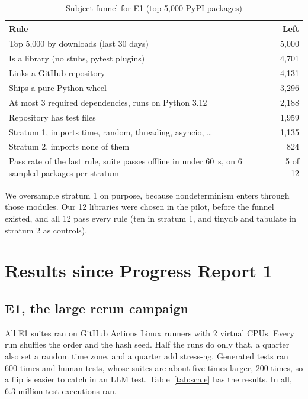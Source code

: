 \documentclass[sigconf,nonacm]{acmart}
\begin{document}
\begin{table}[h]
\caption{Subject funnel for E1 (top 5,000 PyPI packages)}
\label{tab:funnel}
\small
\begin{tabularx}{\columnwidth}{Xr}
\toprule
Rule & Left \\
\midrule
Top 5,000 by downloads (last 30 days) & 5,000 \\
Is a library (no stubs, pytest plugins) & 4,701 \\
Links a GitHub repository & 4,131 \\
Ships a pure Python wheel & 3,296 \\
At most 3 required dependencies, runs on Python 3.12 & 2,188 \\
Repository has test files & 1,959 \\
\quad Stratum 1, imports time, random, threading, asyncio, \dots & 1,135 \\
\quad Stratum 2, imports none of them & 824 \\
\midrule
Pass rate of the last rule, suite passes offline in under 60~s, on 6 sampled packages per stratum & 5 of 12 \\
\bottomrule
\end{tabularx}
\end{table}

We oversample stratum 1 on purpose, because nondeterminism enters through those modules. Our 12 libraries were chosen in the pilot, before the funnel existed, and all 12 pass every rule (ten in stratum 1, and tinydb and tabulate in stratum 2 as controls).

\section{Results since Progress Report 1}

\subsection{E1, the large rerun campaign}
\label{sec:scale}
All E1 suites ran on GitHub Actions Linux runners with 2 virtual CPUs. Every run shuffles the order and the hash seed. Half the runs do only that, a quarter also set a random time zone, and a quarter add stress-ng. Generated tests ran 600 times and human tests, whose suites are about five times larger, 200 times, so a flip is easier to catch in an LLM test. Table~\ref{tab:scale} has the results. In all, 6.3 million test executions ran.
\end{document}
